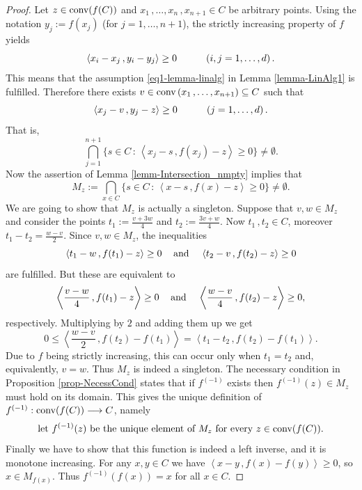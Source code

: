 \documentclass[12pt]{amsart}
\theoremstyle{remark}
\theoremstyle{definition}
\newcommand{\conv}{\mbox{\rm conv}}
\newcommand{\map}{\longrightarrow}
\newcommand{\bsz}[2]{\left \langle #1 \,, #2 \right \rangle}
\begin{document}
\begin{proof}
Let $ z \in \conv (f(C)) $ and 
$ x_1 \,, \dots , x_n \,, x_{n+1} \in C $ 
be arbitrary points. Using the notation 
$ y_j := f(x_j) $ (for $ j = 1 , \dots , n+1 $), 
the strictly increasing property of $ f $ yields 
\[
\bsz{x_i-x_j}{y_i-y_j} \geq 0 
\hspace{10mm}
\left( i,j = 1 , \dots , d \right). 
\]
This means that the assumption \eqref{eq1-lemma-linalg} 
in Lemma \ref{lemma-LinAlg1} is fulfilled. Therefore 
there exists 
$ v \in \conv \left( x_1 \,, \dots , x_{n+1} \right) 
\subseteq C $ such that 
\[
\bsz{x_j - v}{y_j - z} \geq 0 
\hspace{10mm} 
\left( j = 1 , \dots , d \right). 
\]
That is, 
\[
\bigcap_{j=1}^{n+1} 
\lbrace s \in C \, : \, 
\bsz{x_j-s}{f(x_j)-z} \geq 0 
\rbrace \neq \emptyset. 
\]
Now the assertion of 
Lemma \ref{lemm-Intersection_nmpty} implies that 
\[
M_z := 
\bigcap_{x \in C} 
\lbrace s \in C \, : \, 
\bsz{x-s}{f(x)-z} \geq 0 
\rbrace \neq \emptyset. 
\]
We are going to show that $ M_z $ is actually a singleton. 
Suppose that $ v,w \in M_z $ and consider the points 
$ t_1 := \frac{v+3w}{4} $ and $ t_2 := \frac{3v+w}{4} $. 
Now $ t_1 \,, t_2 \in C $, moreover 
$ t_1 - t_2 = \frac{w-v}{2} $. Since $ v,w \in M_z $, 
the inequalities 
\[
\bsz{t_1-w}{f(t_1)-z} \geq 0 
\hspace{3mm} \mbox{ and } \hspace{3mm} 
\bsz{t_2-v}{f(t_2)-z} \geq 0 
\]
are fulfilled. But these are equivalent to 
\[
\bsz{\frac{v-w}{4}}{f(t_1)-z} \geq 0 
\hspace{3mm} \mbox{ and } \hspace{3mm} 
\bsz{\frac{w-v}{4}}{f(t_2)-z} \geq 0, 
\]
respectively. Multiplying by $ 2 $ and adding them up we 
get 
\[
0 \leq \bsz{\frac{w-v}{2}}{f(t_2) - f(t_1)} = 
\bsz{t_1-t_2}{f(t_2) - f(t_1)}. 
\]
Due to $ f $ being strictly increasing, this can occur 
only when $ t_1 = t_2 $ and, equivalently, $ v=w $. 
Thus $ M_z $ is indeed a singleton. 
The necessary condition in Proposition \ref{prop-NecessCond} 
states that if $ f^{(-1)} $ exists then 
$ f^{(-1)}(z) \in M_z $ must hold on its domain. 
This gives the unique definition of 
$ f^{(-1)} : \conv (f(C)) \map C $, namely 
\[
\mbox{let } f^{(-1)}(z) 
\mbox{ be the unique element of } M_z 
\mbox{ for every } z \in \conv (f(C)). 
\] 
Finally we have to show that this function is indeed a 
left inverse, and it is monotone increasing. 
For any $ x,y \in C $ we have 
$ \bsz{x-y}{f(x)-f(y)} \geq 0 $, so $ x \in M_{f(x)} $. 
Thus $ f^{(-1)}(f(x)) = x $ for all $ x \in C $. 

\end{proof}
\end{document}
